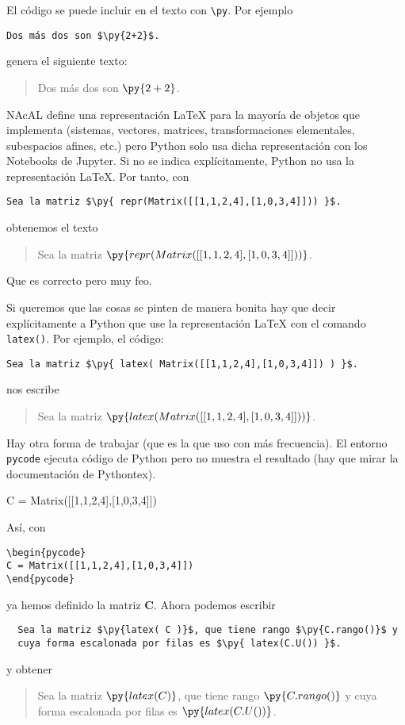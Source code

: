 \documentclass[12pt,a4paper]{article} %
\begin{document}
El código se puede incluir en el texto con \verb+\py+. Por ejemplo
\begin{Verbatim}
Dos más dos son $\py{2+2}$.
\end{Verbatim}
genera el siguiente texto:
\begin{quote}
  Dos más dos son $\py{2+2}$.
\end{quote}

NAcAL define una representación \LaTeX{} para la mayoría de objetos
que implementa (sistemas, vectores, matrices, transformaciones
elementales, subespacios afines, etc.) pero Python solo usa dicha
representación con los Notebooks de Jupyter. Si no se indica
explícitamente, Python no usa la representación \LaTeX{}. Por tanto,
con
\begin{Verbatim}
Sea la matriz $\py{ repr(Matrix([[1,1,2,4],[1,0,3,4]])) }$.
\end{Verbatim}
obtenemos el texto
\begin{quote}
  Sea la matriz $\py{ repr(Matrix([[1,1,2,4],[1,0,3,4]])) }$.
\end{quote}
Que es correcto pero muy feo.
\medskip


Si queremos que las cosas se pinten de manera bonita hay que decir
explícitamente a Python que use la representación \LaTeX{} con el
comando \texttt{latex()}. Por ejemplo, el código:

\begin{Verbatim}
Sea la matriz $\py{ latex( Matrix([[1,1,2,4],[1,0,3,4]]) ) }$.
\end{Verbatim}
nos escribe
\begin{quote}
  Sea la matriz $\py{ latex( Matrix([[1,1,2,4],[1,0,3,4]]) ) }$.
\end{quote}
\medskip


Hay otra forma de trabajar (que es la que uso con más frecuencia). El
entorno \texttt{pycode} ejecuta código de Python pero no muestra el
resultado (hay que mirar la documentación de Pythontex).
\begin{pycode}
C = Matrix([[1,1,2,4],[1,0,3,4]])
\end{pycode}  
Así, con
\begin{Verbatim}
\begin{pycode}
C = Matrix([[1,1,2,4],[1,0,3,4]])
\end{pycode}  
\end{Verbatim}
ya hemos definido la matriz $\mathbf{C}$. Ahora podemos escribir
\begin{Verbatim}
  Sea la matriz $\py{latex( C )}$, que tiene rango $\py{C.rango()}$ y
  cuya forma escalonada por filas es $\py{ latex(C.U()) }$.
\end{Verbatim}
y obtener
\begin{quote}
  Sea la matriz $\py{latex( C )}$, que tiene rango $\py{C.rango()}$ y
  cuya forma escalonada por filas es $\py{ latex(C.U()) }$.
\end{quote}
\end{document}
